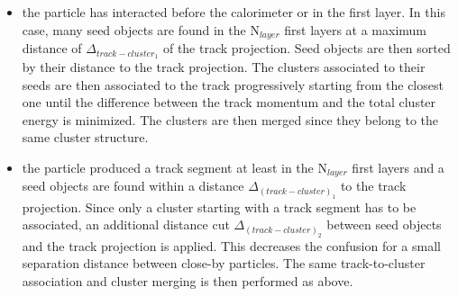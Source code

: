 \documentclass[cits]{JINST}
\begin{document}
\begin{itemize}
  \item the particle has interacted before the calorimeter or in the first layer. In this case, many seed objects are found in the N$_{layer}$ first layers at a maximum distance of $\Delta_{{track-cluster}_1}$ of the track projection. Seed objects are then sorted by their distance to the track projection. The clusters associated to their seeds are then associated to the track progressively starting from the closest one until the difference between the track momentum and the total cluster energy is minimized. The clusters are then merged since they belong to the same cluster structure.
  \item the particle produced a track segment at least in the N$_{layer}$ first layers and a seed objects are found within a distance $\Delta_{(track-cluster)_1}$ to the track projection. Since only a cluster starting with a track segment has to be associated, an additional distance cut $\Delta_{(track-cluster)_2}$ between seed objects and the track projection is applied. This decreases the confusion for a small separation distance between close-by particles. The same track-to-cluster association and cluster merging is then performed as above.
\end{itemize}
\end{document}

